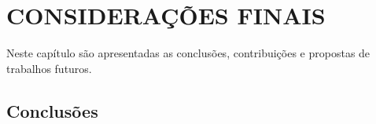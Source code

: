 \chapter{CONSIDERAÇÕES FINAIS}\label{ch:conclusoes}

Neste capítulo são apresentadas as conclusões, contribuições e propostas de trabalhos futuros.

\section{Conclusões}\label{sec:conclusoes}
